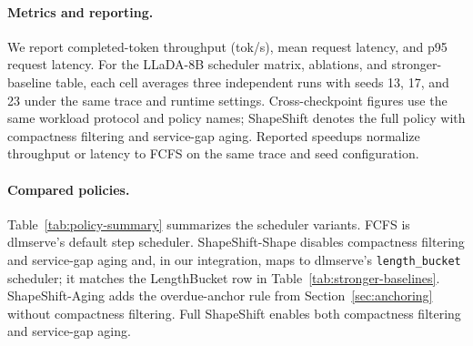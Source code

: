 \documentclass[a4paper]{llncs}
\begin{document}
\paragraph{Metrics and reporting.}
We report completed-token throughput (tok/s), mean request latency, and p95 request latency. For the LLaDA-8B scheduler matrix, ablations, and stronger-baseline table, each cell averages three independent runs with seeds 13, 17, and 23 under the same trace and runtime settings. Cross-checkpoint figures use the same workload protocol and policy names; ShapeShift denotes the full policy with compactness filtering and service-gap aging. Reported speedups normalize throughput or latency to FCFS on the same trace and seed configuration.

\paragraph{Compared policies.}
Table~\ref{tab:policy-summary} summarizes the scheduler variants. FCFS is dlmserve's default step scheduler. ShapeShift-Shape disables compactness filtering and service-gap aging and, in our integration, maps to dlmserve's \texttt{length\_bucket} scheduler; it matches the LengthBucket row in Table~\ref{tab:stronger-baselines}. ShapeShift-Aging adds the overdue-anchor rule from Section~\ref{sec:anchoring} without compactness filtering. Full ShapeShift enables both compactness filtering and service-gap aging.

\begin{table}[t]
\centering
\caption{Scheduler policies compared in the evaluation.}
\label{tab:policy-summary}
\scriptsize
\setlength{\tabcolsep}{2.5pt}
\end{table}
\end{document}
